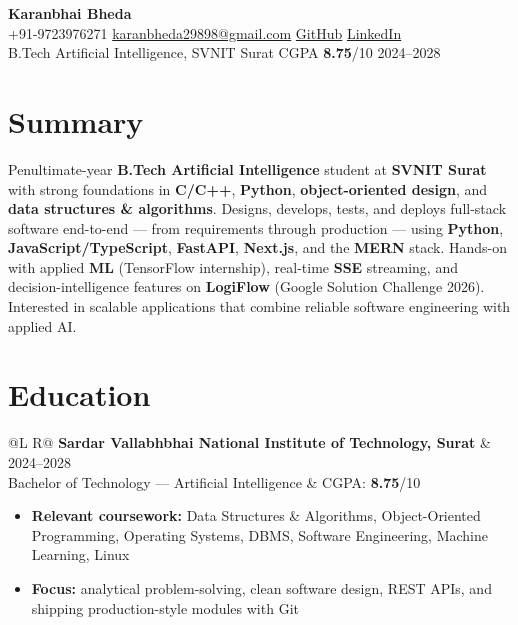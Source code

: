 \documentclass[a4paper,10pt]{article}
\makeatletter
\newcommand{\entry}[4]{%
  \vspace{0.6mm}
  \noindent\begin{tabularx}{\textwidth}{@{}L R@{}}
    \textbf{#1} & {\small #2} \\
    {\small #3} & {\small #4} \\
  \end{tabularx}\par
}
\makeatother
\begin{document}
\selectfont

\begin{center}
  {\LARGE \textbf{Karanbhai Bheda}} \\[1.1mm]
  \small
  +91-9723976271 \textbar{}
  \href{mailto:karanbheda29898@gmail.com}{karanbheda29898@gmail.com} \textbar{}
  \href{https://github.com/KARANBHAI029}{GitHub} \textbar{}
  \href{https://www.linkedin.com/in/karan-bheda-2a7483335/}{LinkedIn} \\[0.4mm]
  B.Tech Artificial Intelligence, SVNIT Surat \textbar{} CGPA \textbf{8.75}/10 \textbar{} 2024--2028
\end{center}

\section{Summary}
\noindent\small
Penultimate-year \textbf{B.Tech Artificial Intelligence} student at \textbf{SVNIT Surat} with strong foundations in \textbf{C/C++}, \textbf{Python}, \textbf{object-oriented design}, and \textbf{data structures \& algorithms}.
Designs, develops, tests, and deploys full-stack software end-to-end --- from requirements through production --- using \textbf{Python}, \textbf{JavaScript/TypeScript}, \textbf{FastAPI}, \textbf{Next.js}, and the \textbf{MERN} stack.
Hands-on with applied \textbf{ML} (TensorFlow internship), real-time \textbf{SSE} streaming, and decision-intelligence features on \textbf{LogiFlow} (Google Solution Challenge 2026).
Interested in scalable applications that combine reliable software engineering with applied AI.

\section{Education}
\entry{Sardar Vallabhbhai National Institute of Technology, Surat}{2024--2028}
{Bachelor of Technology --- Artificial Intelligence}{CGPA: \textbf{8.75}/10}
\begin{itemize}
  \item \textbf{Relevant coursework:} Data Structures \& Algorithms, Object-Oriented Programming, Operating Systems, DBMS, Software Engineering, Machine Learning, Linux
  \item \textbf{Focus:} analytical problem-solving, clean software design, REST APIs, and shipping production-style modules with Git
\end{itemize}
\end{document}
